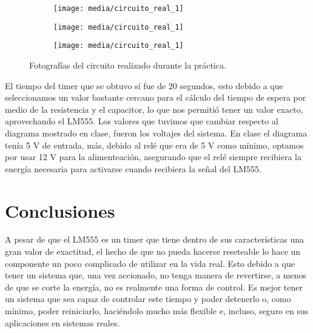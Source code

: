 \documentclass{article}
\begin{document}
\begin{figure}[htb]
    \centering
    \begin{subfigure}[htb]{0.45\textwidth}
        \centering
        \texttt{[image: media/circuito\_real\_1]}
        \caption{}
    \end{subfigure}
    \centering
    \begin{subfigure}[htb]{0.45\textwidth}
        \centering
        \texttt{[image: media/circuito\_real\_1]}
        \caption{}
    \end{subfigure}
    \centering
    \begin{subfigure}[htb]{0.45\textwidth}
        \centering
        \texttt{[image: media/circuito\_real\_1]}
        \caption{}
    \end{subfigure}
    \caption{Fotografías del circuito realizado durante la práctica.}
    \label{Fig: Fotografias del circuito realizado durante la practica}
\end{figure}

El tiempo del timer que se obtuvo sí fue de 20 segundos, esto debido a que seleccionamos un valor bastante cercano para el cálculo del tiempo de espera por medio de la resistencia y el capacitor, lo que nos permitió tener un valor exacto, aprovechando el LM555. Los valores que tuvimos que cambiar respecto al diagrama mostrado en clase, fueron los voltajes del sistema. En clase el diagrama tenía 5 V de entrada, más, debido al relé que era de 5 V como mínimo, optamos por usar 12 V para la alimenteación, asegurando que el relé siempre recibiera la energía necesaria para activarse cuando recibiera la señal del LM555.

\section{Conclusiones}

A pesar de que el LM555 es un timer que tiene dentro de sus características una gran valor de exactitud, el hecho de que no pueda hacerse reseteable lo hace un componente un poco complicado de utilizar en la vida real. Esto debido a que tener un sistema que, una vez accionado, no tenga manera de revertirse, a menos de que se corte la energía, no es realmente una forma de control. Es mejor tener un sistema que sea capaz de controlar este tiempo y poder detenerlo o, como mínimo, poder reiniciarlo, haciéndolo mucho más flexible e, incluso, seguro en sus aplicaciones en sistemas reales.

\printbibliography
\end{document}
